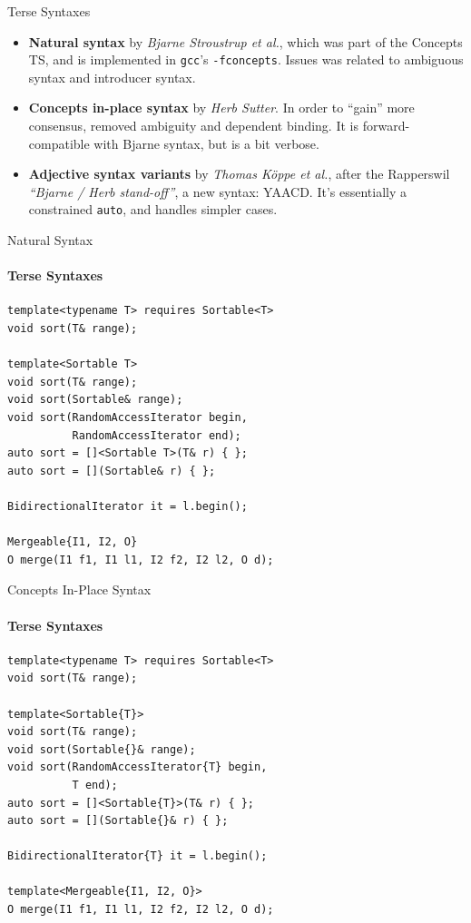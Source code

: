 \documentclass{beamer}
\begin{document}
    \begin{frame}[fragile]{Terse Syntaxes}
        \begin{itemize}
            \item{\textbf{Natural syntax} by \emph{Bjarne Stroustrup et al.}, which was part of the Concepts TS, and is implemented in \texttt{gcc}'s \texttt{-fconcepts}. Issues was related to ambiguous syntax and introducer syntax.}
            \item{\textbf{Concepts in-place syntax} by \emph{Herb Sutter}. In order to ``gain'' more consensus, removed ambiguity and dependent binding. It is forward-compatible with Bjarne syntax, but is a bit verbose.}
            \item{\textbf{Adjective syntax variants} by \emph{Thomas Köppe et al.}, after the Rapperswil \emph{``Bjarne / Herb stand-off''}, a new syntax: YAACD. It's essentially a constrained \texttt{auto}, and handles simpler cases.}
        \end{itemize}
    \end{frame}

    \begin{frame}[fragile]{Natural Syntax}
        \framesubtitle{Terse Syntaxes}
        \begin{center}
        \begin{lstlisting}
template<typename T> requires Sortable<T>
void sort(T& range);

template<Sortable T>
void sort(T& range);
void sort(Sortable& range);
void sort(RandomAccessIterator begin,
          RandomAccessIterator end);
auto sort = []<Sortable T>(T& r) { };
auto sort = [](Sortable& r) { };

BidirectionalIterator it = l.begin();

Mergeable{I1, I2, O}
O merge(I1 f1, I1 l1, I2 f2, I2 l2, O d); \end{lstlisting}
        \end{center}
    \end{frame}

    \begin{frame}[fragile]{Concepts In-Place Syntax}
        \framesubtitle{Terse Syntaxes}
        \begin{center}
        \begin{lstlisting}
template<typename T> requires Sortable<T>
void sort(T& range);

template<Sortable{T}>
void sort(T& range);
void sort(Sortable{}& range);
void sort(RandomAccessIterator{T} begin,
          T end);
auto sort = []<Sortable{T}>(T& r) { };
auto sort = [](Sortable{}& r) { };

BidirectionalIterator{T} it = l.begin();

template<Mergeable{I1, I2, O}>
O merge(I1 f1, I1 l1, I2 f2, I2 l2, O d); \end{lstlisting}
        \end{center}
    \end{frame}
\end{document}

